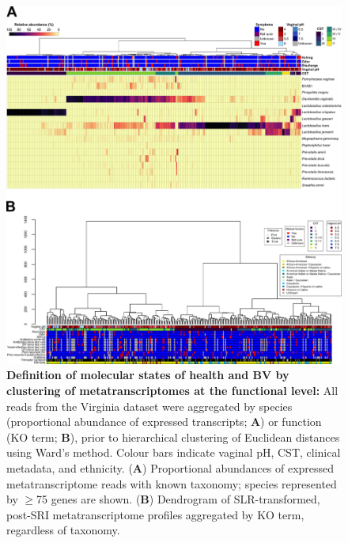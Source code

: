\documentclass[sn-mathphys,Numbered]{sn-jnl}%
\begin{document}
\begin{figure}[H]
    \centering
    \includegraphics[scale = 0.795]{0_supplFig4.png}
    \caption{\textbf{Definition of molecular states of health and BV by clustering of metatranscriptomes at the functional level:} All reads from the Virginia dataset were aggregated by species (proportional abundance of expressed transcripts; \textbf{A}) or function (KO term; \textbf{B}), prior to hierarchical clustering of Euclidean distances using Ward's method. Colour bars indicate vaginal pH, CST, clinical metadata, and ethnicity. (\textbf{A}) Proportional abundances of expressed metatranscriptome reads with known taxonomy; species represented by $\geq$75 genes are shown. (\textbf{B}) Dendrogram of SLR-transformed, post-SRI metatranscriptome profiles aggregated by KO term, regardless of taxonomy.} \label{sig:sfigVirgDendro}
\end{figure}
\newpage
\end{document}
